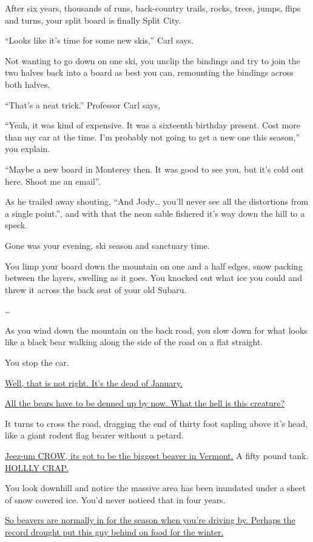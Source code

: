 \documentclass[17pt, twoside, a5paper, openright, extrafontsizes]{memoir}
\renewcommand{\emph}[1]{\ul{#1}}
\begin{document}
After six years, thousands of runs, back-country trails, rocks, trees,
jumps, flips and turns, your split board is finally Split City.

``Looks like it's time for some new skis,'' Carl says.

Not wanting to go down on one ski, you unclip the bindings and try to
join the two halves back into a board as best you can, remounting the
bindings across both halves.

``That's a neat trick.'' Professor Carl says,

``Yeah, it was kind of expensive. It was a sixteenth birthday present.
Cost more than my car at the time. I'm probably not going to get a new
one this season,'' you explain.

``Maybe a new board in Monterey then. It was good to see you, but it's
cold out here. Shoot me an email''.

As he trailed away shouting, ``And Jody\ldots{} you'll never see all the
distortions from a single point.'', and with that the neon sable
fishered it's way down the hill to a speck.

Gone was your evening, ski season and sanctuary time.

You limp your board down the mountain on one and a half edges, snow
packing between the layers, swelling as it goes. You knocked out what
ice you could and threw it across the back seat of your old Subaru.

\ldots{}

As you wind down the mountain on the back road, you slow down for what
looks like a black bear walking along the side of the road on a flat
straight.

You stop the car.

\emph{Well, that is not right. It's the dead of January.}

\emph{All the bears have to be denned up by now. What the hell is this
creature?}

It turns to cross the road, dragging the end of thirty foot sapling
above it's head, like a giant rodent flag bearer without a petard.

\emph{Jeez-um CROW, its got to be the biggest beaver in Vermont.} A
fifty pound tank. \emph{HOLLLY CRAP.}

You look downhill and notice the massive area has been inundated under a
sheet of snow covered ice. You'd never noticed that in four years.

\emph{So beavers are normally in for the season when you're driving by.
Perhaps the record drought put this guy behind on food for the winter.}
\end{document}
